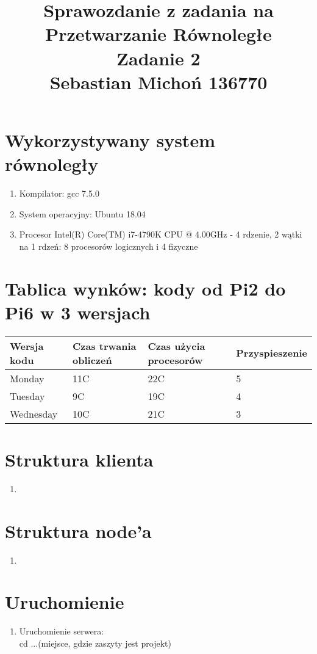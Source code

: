 \documentclass[12pt]{article}
\begin{document}
\title{Sprawozdanie z zadania na Przetwarzanie Równoległe\\
\large Zadanie 2\\
\large Sebastian Michoń 136770}
\date{\vspace{-10ex}}
\maketitle

\section{Wykorzystywany system równoległy}
\begin {enumerate}
	\item Kompilator: gcc 7.5.0
	\item System operacyjny: Ubuntu 18.04
	\item Procesor Intel(R) Core(TM) i7-4790K CPU @ 4.00GHz - 4 rdzenie, 2 wątki na 1 rdzeń: 8 procesorów logicznych i 4 fizyczne
\end {enumerate}

\section{Tablica wynków: kody od Pi2 do Pi6 w 3 wersjach}
\begin{center}
	\begin{tabular}{| l | l | l | l |}
		\hline
		Wersja kodu & Czas trwania obliczeń & Czas użycia procesorów & Przyspieszenie \\ \hline
		Monday & 11C & 22C & 5 \\ \hline
		Tuesday & 9C & 19C & 4 \\ \hline
		Wednesday & 10C & 21C & 3 \\
		\hline
	\end{tabular}
\end{center}
	 
\section{Struktura klienta}
\begin{enumerate}
	\item 
\end{enumerate}

\section{Struktura node'a}
\begin{enumerate}
	\item 
\end{enumerate}

\section{Uruchomienie}
\begin{enumerate}
	\item Uruchomienie serwera:\\
		cd ...(miejsce, gdzie zaszyty jest projekt)\\
		
		
\end{enumerate}
\end{document}
